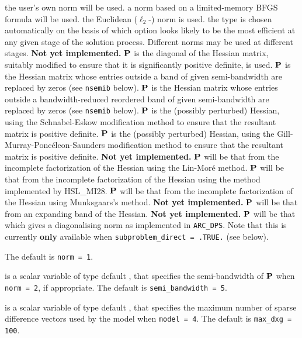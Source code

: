 \documentclass{galahad}
\newcommand{\packagename}{ARC}
\begin{document}
\begin{description}
\begin{description}
 the user's own norm will be used.
 a norm based on a limited-memory BFGS formula will be used.
 the Euclidean ($\ell_2$-) norm is used.
 the type is chosen automatically on the basis of which option looks
        likely to be the most efficient at any given stage of the solution
        process. Different norms may be used at different stages.
        {\bf Not yet implemented.}
 ${\mathbf{P}}$ is the diagonal of the Hessian matrix, suitably modified to
        ensure that it is significantly positive definite, is used.
 ${\mathbf{P}}$ is the Hessian matrix whose entries outside a band of
         given semi-bandwidth are replaced by zeros
        (see {\tt nsemib} below).
 ${\mathbf{P}}$ is the Hessian matrix whose entries outside a
        bandwidth-reduced reordered band of given semi-bandwidth are
        replaced by zeros (see {\tt nsemib} below).
 ${\mathbf{P}}$ is the (possibly perturbed) Hessian,
         using the Schnabel-Eskow modification
        method to ensure that the resultant matrix is positive definite.
 ${\mathbf{P}}$ is the (possibly perturbed) Hessian,
        using the Gill-Murray-Ponc\'{e}leon-Saunders
        modification method to ensure that the resultant matrix is
        positive definite.
        {\bf Not yet implemented.}
 ${\mathbf{P}}$ will be that from the incomplete factorization of the Hessian
        using the Lin-Mor\'{e} method.
 ${\mathbf{P}}$ will be that from the incomplete factorization of the Hessian
        using the method implemented by HSL\_MI28.
 ${\mathbf{P}}$ will be that from the incomplete factorization of the Hessian
        using Munksgaars's method. {\bf Not yet implemented.}
 ${\mathbf{P}}$ will be that from an expanding band of the Hessian.
        {\bf Not yet implemented.}
 ${\mathbf{P}}$ will be that which gives a diagonalising norm as implemented in
         {\tt \packagename\_DPS}. Note that this is currently {\bf only}
         available when {\tt subproblem\_direct = .TRUE.} (see below).
\end{description}
The default is {\tt norm = 1}.

 is a scalar variable of type default \integer,
that specifies
the semi-bandwidth of ${\mathbf{P}}$ when {\tt norm = 2},
if appropriate.
The default is {\tt semi\_bandwidth = 5}.

 is a scalar variable of type default \integer,
that specifies the maximum number of sparse difference
vectors used by the model when {\tt model = 4}.
The default is {\tt max\_dxg = 100}.


\end{description}
\end{document}
